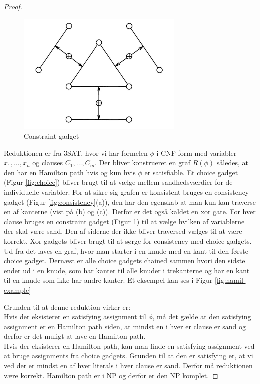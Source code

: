 \begin{itemize}
\begin{proof}
  \begin{figure}[ht]
  	\centering
  	\includegraphics[width=300px]{img/constraint_gadget}
  	\caption{Constraint gadget\label{fig:constraint}}
  \end{figure}


    Reduktionen er fra 3SAT, hvor vi har formelen $\phi$ i CNF form med variabler $x_1, \dots, x_n$ og clauses $C_1, \dots, C_m$. Der bliver konstrueret en graf $R(\phi)$ således, at den har en Hamilton path hvis og kun hvis $\phi$ er satisfiable. Et choice gadget (Figur \ref{fig:choice}) bliver brugt til at vælge mellem sandhedsværdier for de individuelle variabler. For at sikre sig grafen er konsistent bruges en consistency gadget (Figur \ref{fig:consistency}(a)), den har den egenskab at man kun kan traverse en af kanterne (vist på (b) og (c)). Derfor er det også kaldet en xor gate. For hver clause bruges en constraint gadget (Figur \ref{fig:constraint}) til at vælge hvilken af variablerne der skal være sand. Den af siderne der ikke bliver traversed vælges til at være korrekt. Xor gadgets bliver brugt til at sørge for consistency med choice gadgets. Ud fra det laves en graf, hvor man starter i en knude med en kant til den første choice gadget. Dernæst er alle choice gadgets chained sammen hvori den sidste ender ud i en knude, som har kanter til alle knuder i trekanterne og har en kant til en knude som ikke har andre kanter. Et eksempel kan ses i Figur \ref{fig:hamil-example} \smallskip 
  
    Grunden til at denne reduktion virker er: \\
    Hvis der eksisterer en satisfying assignment til $\phi$, må det gælde at den satisfying assignment er en Hamilton path siden, at mindst en i hver er clause er sand og derfor er det muligt at lave en Hamilton path. \\
    Hvis der eksisterer en Hamilton path, kan man finde en satisfying assignment ved at bruge assignments fra choice gadgets. Grunden til at den er satisfying er, at vi ved der er mindst en af hver literals i hver clause er sand. Derfor må reduktionen være korrekt. Hamilton path er i NP og derfor er den NP komplet. 


\end{proof}
\end{itemize}
